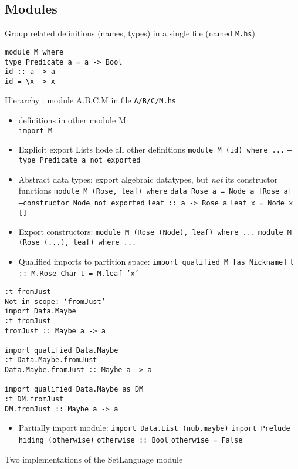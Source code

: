 \documentclass{article}
\newcommand{\Haskell}[1]{\texttt{#1}}
\begin{document}
\subsection{Modules}
Group related definitions (names, types) in a single file (named \verb|M.hs|)
\begin{verbatim}
module M where
type Predicate a = a -> Bool
id :: a -> a
id = \x -> x
\end{verbatim}
Hierarchy : module A.B.C.M in file \verb|A/B/C/M.hs|
\begin{itemize}
\item definitions in other module M:\\
\subitem \Haskell{import M}
\item Explicit export Lists hode all other definitions
\subitem \Haskell{module M (id) where ...}
\subsubitem \Haskell{--type Predicate a not exported} 
\item Abstract data types: export algebraic datatypes, but \emph{not} its constructor functions
\subitem \Haskell{module M (Rose, leaf) where}
\subitem \Haskell{data Rose a = Node a [Rose a] --constructor Node not exported}
\subitem \Haskell{leaf :: a -> Rose a}
\subitem \Haskell{leaf x = Node x []}
\item Export constructors:
\subitem \Haskell{module M (Rose (Node), leaf) where ...}
\subitem \Haskell{module M (Rose (...), leaf)  where ...}
\item Qualified imports to partition space:
\subitem \Haskell{import qualified M [as Nickname]}
\subitem \Haskell{t :: M.Rose Char}
\subitem \Haskell{t = M.leaf 'x'}
\end{itemize}
\begin{verbatim}
:t fromJust
Not in scope: ‘fromJust’
import Data.Maybe
:t fromJust
fromJust :: Maybe a -> a

import qualified Data.Maybe
:t Data.Maybe.fromJust
Data.Maybe.fromJust :: Maybe a -> a

import qualified Data.Maybe as DM
:t DM.fromJust
DM.fromJust :: Maybe a -> a
\end{verbatim}
\begin{itemize}
\item Partially import module:
\subitem \Haskell{import Data.List (nub,maybe)}
\subitem \Haskell{import Prelude hiding (otherwise)}
\subitem \Haskell{otherwise :: Bool}
\subitem \Haskell{otherwise = False}
\end{itemize}
\begin{listing}[h!]
\caption{Two implementations of the SetLanguage module}
\inputminted{Haskell}{SetLanguage.hs}
\inputminted{Haskell}{SetLanguageFunction.hs}
\end{listing}
\clearpage
\end{document}
